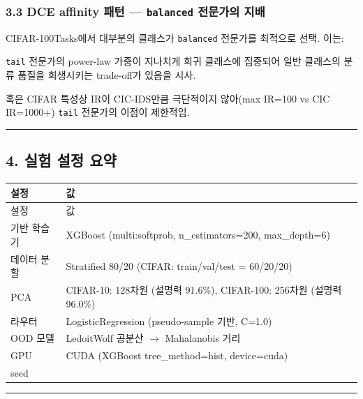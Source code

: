 \subsubsection{3.3 DCE affinity 패턴 — \texttt{balanced\allowbreak{}} 전문가의 지배}
CIFAR-100Tasks에서 대부분의 클래스가 \texttt{balanced\allowbreak{}} 전문가를 최적으로 선택. 이는:

\par\noindent \textbullet\enspace \texttt{tail} 전문가의 power-law 가중이 지나치게 희귀 클래스에 집중되어 일반 클래스의 분류 품질을 희생시키는 trade-off가 있음을 시사.


\par\noindent \textbullet\enspace 혹은 CIFAR 특성상 IR이 CIC-IDS만큼 극단적이지 않아(max IR=\allowbreak{}100 vs CIC IR=\allowbreak{}1000+\allowbreak{}) \texttt{tail} 전문가의 이점이 제한적임.



\medskip\hrule\medskip
\subsection{4. 실험 설정 요약}
\begingroup
\footnotesize
\begin{longtable}{>{\raggedright\arraybackslash}p{}>{\raggedright\arraybackslash}p{}}
\toprule
설정 & 값 \\ \midrule
\endfirsthead
설정 & 값 \\ \midrule
\endhead
{}기반 학습기 & XGBoost (multi:softprob, n\_\allowbreak{}estimators=\allowbreak{}200, max\_\allowbreak{}depth=\allowbreak{}6) \\
{}데이터 분할 & Stratified 80/\allowbreak{}20 (CIFAR: train/\allowbreak{}val/\allowbreak{}test =\allowbreak{} 60/\allowbreak{}20/\allowbreak{}20) \\
{}PCA & CIFAR-10: 128차원 (설명력 91.6\%), CIFAR-100: 256차원 (설명력 96.0\%) \\
{}라우터 & LogisticRegression (pseudo-sample 기반, C=\allowbreak{}1.0) \\
{}OOD 모델 & LedoitWolf 공분산  \ensuremath{\rightarrow}  Mahalanobis 거리 \\
{}GPU & CUDA (XGBoost tree\_\allowbreak{}method=\allowbreak{}hist, device=\allowbreak{}cuda) \\
{}seed & 42 \\
\bottomrule
\end{longtable}
\endgroup

\medskip\hrule\medskip
